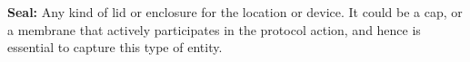 \documentclass[11pt,a4paper]{article}
\begin{document}
\noindent
\textbf{Seal:} Any kind of lid or enclosure for the location or device. It could be a cap, or a membrane that actively participates in the protocol action, and hence is essential to capture this type of entity.

\begin{comment}
\begin{table*}[]
\centering
\small
\begin{tabular}{|l|l|l|l|l|l|l|}
\hline
\thead{Protocol Category} & \thead{Count} & \thead{Avg no. \\ Sent.}     & \thead{Avg. no. \\ Words}     & \thead{Avg. no. \\ Entities}  & \thead{Avg. no. \\ Relations} & \thead{Avg. no. \\ Actions}   \\
\hline
molecular biology & 186   & 27.42   & 338.06 & 85.25  & 84.20   & 35.77 \\
microbiology      & 105   & 22.07 & 328.94  & 74.46  & 71.71  & 27.89 \\
cell biology      & 94    & 19.23  & 236.74 & 61.09  & 60.95   & 23.93 \\
Plant biology     & 48    & 17.17 & 219.96 & 44.67 & 43.85 & 20.44            \\
Immunology        & 79    & 25.92 & 339.58  & 83.17  & 78.24  & 32.68  \\
chemical biology  & 110   & 14.37 & 188.30  & 46.40   & 47.45 & 19.01 \\
\hline
\end{tabular}
\caption{Statistics of our wet lab protocol corpus by protocol category.}
    \label{tab:p_types_stats}
\end{table*}
\end{comment}
\end{document}
